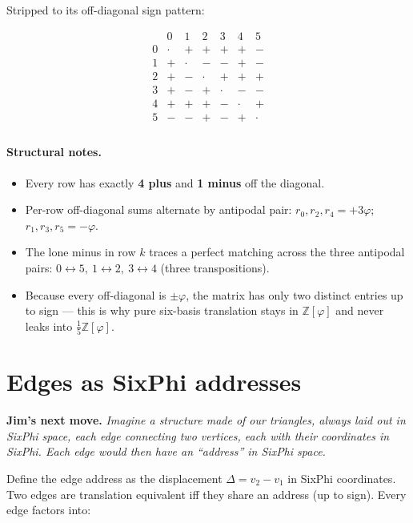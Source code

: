 \documentclass[11pt]{article}
\newcommand{\phigold}{\varphi}
\newcommand{\Zphi}{\mathbb{Z}[\phigold]}
\begin{document}
Stripped to its off-diagonal sign pattern:

\[
\begin{array}{c|cccccc}
   & 0 & 1 & 2 & 3 & 4 & 5 \\ \hline
0  & \cdot & + & + & + & + & - \\
1  & +     & \cdot & - & - & + & - \\
2  & +     & -     & \cdot & + & + & + \\
3  & +     & -     & +     & \cdot & - & - \\
4  & +     & +     & +     & -     & \cdot & + \\
5  & -     & -     & +     & -     & +     & \cdot \\
\end{array}
\]

\paragraph{Structural notes.}
\begin{itemize}
  \item Every row has exactly \textbf{4 plus} and \textbf{1 minus} off the
        diagonal.
  \item Per-row off-diagonal sums alternate by antipodal pair:
        \(r_0,r_2,r_4 = +3\phigold\); \(r_1,r_3,r_5 = -\phigold\).
  \item The lone minus in row \(k\) traces a perfect matching across the
        three antipodal pairs: \(0\!\leftrightarrow\!5,\
        1\!\leftrightarrow\!2,\ 3\!\leftrightarrow\!4\) (three
        transpositions).
  \item Because every off-diagonal is \(\pm\phigold\), the matrix has only
        two distinct entries up to sign --- this is why pure six-basis
        translation stays in \(\Zphi\) and never leaks into
        \(\tfrac{1}{5}\Zphi\).
\end{itemize}

\section{Edges as SixPhi addresses}

\textbf{Jim's next move.}\quad
\emph{Imagine a structure made of our triangles, always laid out in SixPhi
space, each edge connecting two vertices, each with their coordinates in
SixPhi. Each edge would then have an ``address'' in SixPhi space.}

Define the edge address as the displacement
\(\Delta = v_2 - v_1\) in SixPhi coordinates. Two edges are translation
equivalent iff they share an address (up to sign). Every edge factors into:
\end{document}
